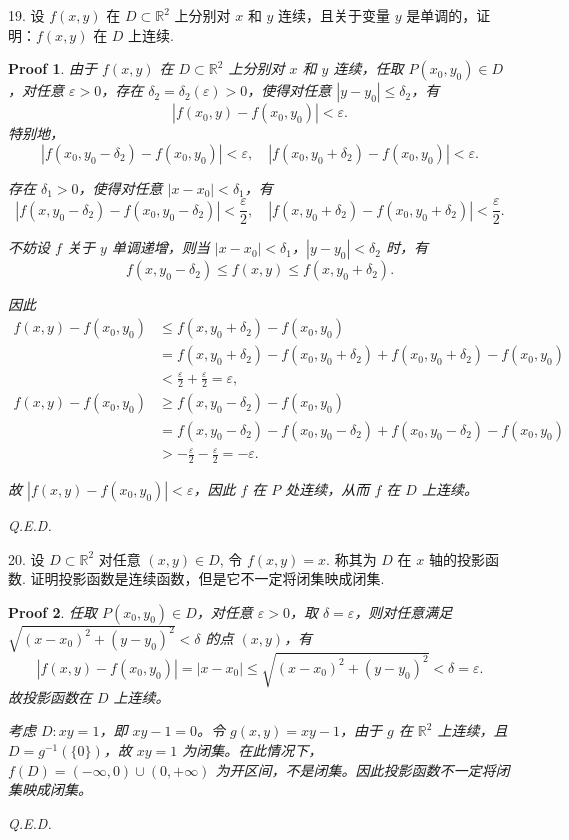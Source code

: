 \documentclass[a4paper,12pt]{article}
\newtheorem*{pf}{Proof}
\begin{document}
19. 设 $f(x,y)$ 在 $D \subset \mathbb{R}^2$ 上分别对 $x$ 和 $y$ 连续，且关于变量 $y$ 是单调的，证明：$f(x,y)$ 在 $D$ 上连续.
\begin{pf}
    由于 $f(x,y)$ 在 $D \subset \mathbb{R}^2$ 上分别对 $x$ 和 $y$ 连续，任取 $P(x_0,y_0)\in D$，对任意 $\varepsilon>0$，存在 $\delta_2=\delta_2(\varepsilon)>0$，使得对任意 $|y-y_0|\leq\delta_2$，有
    $$|f(x_0,y)-f(x_0,y_0)|<\varepsilon.$$
    特别地，
    $$|f(x_0,y_0-\delta_2)-f(x_0,y_0)|<\varepsilon,\quad |f(x_0,y_0+\delta_2)-f(x_0,y_0)|<\varepsilon.$$

    存在 $\delta_1>0$，使得对任意 $|x-x_0|<\delta_1$，有
    $$|f(x,y_0-\delta_2)-f(x_0,y_0-\delta_2)|<\frac{\varepsilon}{2},\quad |f(x,y_0+\delta_2)-f(x_0,y_0+\delta_2)|<\frac{\varepsilon}{2}.$$

    不妨设 $f$ 关于 $y$ 单调递增，则当 $|x-x_0|<\delta_1$，$|y-y_0|<\delta_2$ 时，有
    $$f(x,y_0-\delta_2)\leq f(x,y)\leq f(x,y_0+\delta_2).$$

    因此
    $$
        \begin{aligned}
            f(x,y)-f(x_0,y_0) & \leq f(x,y_0+\delta_2)-f(x_0,y_0)                                      \\
                              & = f(x,y_0+\delta_2)-f(x_0,y_0+\delta_2)+f(x_0,y_0+\delta_2)-f(x_0,y_0) \\
                              & < \frac{\varepsilon}{2}+\frac{\varepsilon}{2}=\varepsilon,
        \end{aligned}
    $$
    $$
        \begin{aligned}
            f(x,y)-f(x_0,y_0) & \geq f(x,y_0-\delta_2)-f(x_0,y_0)                                      \\
                              & = f(x,y_0-\delta_2)-f(x_0,y_0-\delta_2)+f(x_0,y_0-\delta_2)-f(x_0,y_0) \\
                              & > -\frac{\varepsilon}{2}-\frac{\varepsilon}{2}=-\varepsilon.
        \end{aligned}
    $$

    故 $|f(x,y)-f(x_0,y_0)|<\varepsilon$，因此 $f$ 在 $P$ 处连续，从而 $f$ 在 $D$ 上连续。

    Q.E.D.
\end{pf}


20. 设 $D \subset \mathbb{R}^2$ 对任意 $(x,y) \in D$, 令 $f(x,y) = x$. 称其为 $D$ 在 $x$ 轴的投影函数. 证明投影函数是连续函数，但是它不一定将闭集映成闭集.
\begin{pf}
    任取 $P(x_0,y_0)\in D$，对任意 $\varepsilon>0$，取 $\delta=\varepsilon$，则对任意满足 $\sqrt{(x-x_0)^2+(y-y_0)^2}<\delta$ 的点 $(x,y)$，有
    $$|f(x,y)-f(x_0,y_0)|=|x-x_0|\leq\sqrt{(x-x_0)^2+(y-y_0)^2}<\delta=\varepsilon.$$
    故投影函数在 $D$ 上连续。

    考虑 $D: xy=1$，即 $xy-1=0$。令 $g(x,y)=xy-1$，由于 $g$ 在 $\mathbb{R}^2$ 上连续，且 $D=g^{-1}(\{0\})$，故 $xy=1$ 为闭集。在此情况下，$f(D)=(-\infty,0)\cup(0,+\infty)$ 为开区间，不是闭集。因此投影函数不一定将闭集映成闭集。

    Q.E.D.
\end{pf}
\end{document}
